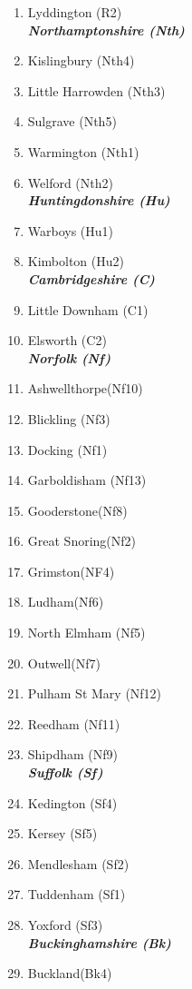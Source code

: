 \begin{refsection}
\begin{multicols}{2}
\begin{enumerate}
		\item Lyddington (R2)\\
		\emph{\textbf{Northamptonshire (Nth)}}
		\item Kislingbury (Nth4)
		\item Little Harrowden (Nth3)
		\item Sulgrave (Nth5)
		\item Warmington (Nth1)
		\item Welford (Nth2)\\
		\emph{\textbf{Huntingdonshire (Hu)}}
		\item Warboys (Hu1)
		\item Kimbolton (Hu2)\\
		\emph{\textbf{Cambridgeshire (C)}}
		\item Little Downham (C1)
		\item Elsworth (C2)\\
		\emph{\textbf{Norfolk (Nf)}}
		\item Ashwellthorpe(Nf10)
		\item Blickling (Nf3)
		\item Docking (Nf1)
		\item Garboldisham (Nf13)
		\item Gooderstone(Nf8)
		\item Great Snoring(Nf2)
		\item Grimston(NF4)
		\item Ludham(Nf6)
		\item North Elmham (Nf5)
		\item Outwell(Nf7)
		\item Pulham St Mary (Nf12)
		\item Reedham (Nf11)
		\item Shipdham (Nf9)\\
		\emph{\textbf{Suffolk (Sf)}}
		\item Kedington (Sf4)
		\item Kersey (Sf5)
		\item Mendlesham (Sf2)
		\item Tuddenham (Sf1)
		\item Yoxford (Sf3)\\
		\emph{\textbf{Buckinghamshire (Bk)}}
		\item Buckland(Bk4)

\end{enumerate}
\end{multicols}
\end{refsection}
